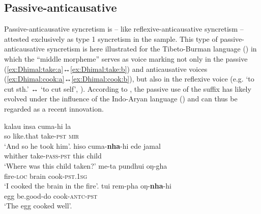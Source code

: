 \subsection{Passive-anticausative} \label{sec:simple-syncretism:pass-antc}
Passive-anticausative syncretism is -- like reflexive-anticausative syncretism -- attested exclusively as type 1 syncretism in the sample. This type of passive-anticausative syncretism is here illustrated for the Tibeto-Burman language  () in which the “middle morpheme”  serves as voice marking not only in the passive (\ref{ex:Dhimal:take:a}↔\ref{ex:Dhimal:take:b}) and anticausative voices (\ref{ex:Dhimal:cook:a}↔\ref{ex:Dhimal:cook:b}), but also in the reflexive voice (e.g.  ‘to cut sth.’ ↔  ‘to cut self’, \citealt[527]{king:j:2009}). According to \citet[239]{khatiwada:2016}, the passive use of the suffix has likely evolved under the influence of the Indo-Aryan language  () and can thus be regarded as a recent innovation. 

\ea {} \citep[189, 459, 604]{king:j:2009}
\ea\label{ex:Dhimal:take:a}
	\gll	kalau insa cuma-hi la \\
			so like.that take-\textsc{pst} \textsc{mir} \\
	\glt	‘And so he took him’.
\ex\label{ex:Dhimal:take:b}
	\gll	hiso cuma-\textbf{nha}-hi ede jamal \\
			whither take-\textsc{pass-pst} this child \\
	\glt	‘Where was this child taken?’
\ex\label{ex:Dhimal:cook:a}
	\gll	me-ta pundhui oŋ-gha \\
			fire-\textsc{loc} brain cook-\textsc{pst.1sg} \\
	\glt	‘I cooked the brain in the fire’.
\ex\label{ex:Dhimal:cook:b}
	\gll	tui rem-pha oŋ-\textbf{nha}-hi \\
			egg be.good-do cook-\textsc{antc-pst} \\
	\glt	‘The egg cooked well’.
	\z 
\z

